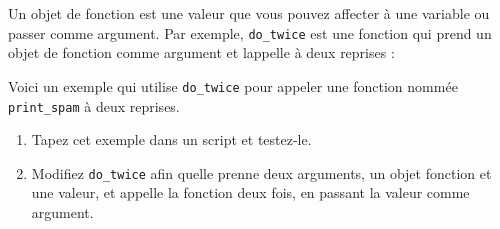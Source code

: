 Un objet de fonction est une valeur que vous pouvez affecter à une
variable ou passer comme argument. Par exemple, \texttt{do\_twice} est
une fonction qui prend un objet de fonction comme argument et
l\textquotesingle appelle à deux reprises :

\begin{Shaded}
\begin{Highlighting}[]
\end{Highlighting}
\end{Shaded}

Voici un exemple qui utilise \texttt{do\_twice} pour appeler une
fonction nommée \texttt{print\_spam} à deux reprises.

\begin{Shaded}
\begin{Highlighting}[]
    \NormalTok{(}\NormalTok{)}

\end{Highlighting}
\end{Shaded}

\begin{enumerate}
\def\labelenumi{\arabic{enumi}.}
\tightlist
\item
  Tapez cet exemple dans un script et testez-le.
\item
  Modifiez \texttt{do\_twice} afin qu\textquotesingle elle prenne deux
  arguments, un objet fonction et une valeur, et appelle la fonction
  deux fois, en passant la valeur comme argument.
\end{enumerate}
